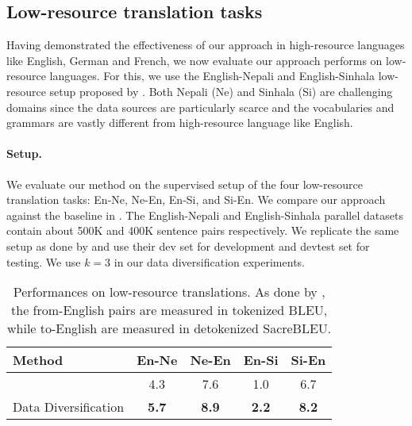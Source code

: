 \documentclass{article}
\begin{document}
\vspace{-0.5em}
\subsection{Low-resource translation tasks}

Having demonstrated the effectiveness of our approach in high-resource languages like English, German and French, we now evaluate our approach performs on low-resource languages. {For this, we use the English-Nepali and English-Sinhala low-resource setup proposed by \citet{flores}.}
Both Nepali (Ne) and Sinhala (Si) are challenging domains since the data sources are particularly scarce and the vocabularies and grammars are vastly different from high-resource language like English. 


\vspace{-0.5em}
\paragraph{Setup.} {We evaluate our method on the supervised setup of the four low-resource translation tasks: En-Ne, Ne-En, En-Si, and Si-En. We compare our approach against the baseline in \citet{flores}. The English-Nepali and English-Sinhala parallel datasets contain about 500K and 400K sentence pairs respectively. We replicate the same setup as done by \citet{flores} and use their dev set for development and devtest set for testing. We use $k=3$ in our data diversification experiments. }

\vspace{-1em}
\begin{table}[h!]
\begin{center}
\caption{Performances on low-resource translations. As done by \citet{flores}, the from-English pairs are measured in tokenized BLEU, while to-English are measured in detokenized SacreBLEU.}
\begin{tabular}{lcccc}
\toprule
{\bf Method}                  & {\bf En-Ne} & {\bf Ne-En} & {\bf En-Si} & {\bf Si-En}\\
\midrule
\citet{flores}                    & 4.3         & 7.6         & 1.0        & 6.7       \\
\midrule
Data Diversification                    & \textbf{5.7}         & \textbf{8.9}         & \textbf{2.2}        & \textbf{8.2}       \\
\bottomrule
\end{tabular}
\label{table:data_diverse_low_resource}
\end{center}
\end{table}
\end{document}
